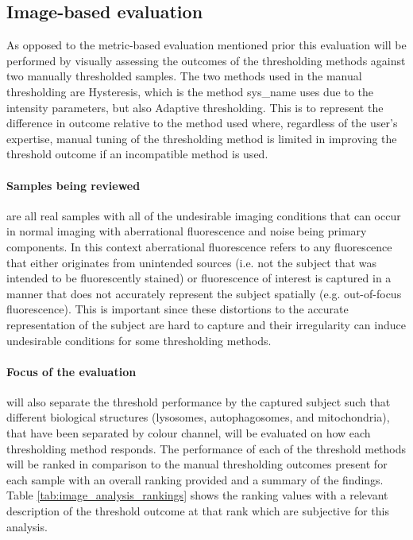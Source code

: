 \subsection{Image-based evaluation}\label{sec:image_compare}
As opposed to the metric-based evaluation mentioned prior this evaluation will be performed by visually assessing the outcomes of the thresholding methods against two manually thresholded samples. The two methods used in the manual thresholding are Hysteresis, which is the method \gls{sys_name} uses due to the intensity parameters, but also Adaptive thresholding. This is to represent the difference in outcome relative to the method used where, regardless of the user's expertise, manual tuning of the thresholding method is limited in improving the threshold outcome if an incompatible method is used.\paragraph{Samples being reviewed} are all real samples with all of the undesirable imaging conditions that can occur in normal imaging with aberrational fluorescence and noise being primary components. In this context aberrational fluorescence refers to any fluorescence that either originates from unintended sources (i.e. not the subject that was intended to be fluorescently stained) or fluorescence of interest is captured in a manner that does not accurately represent the subject spatially (e.g. out-of-focus fluorescence). This is important since these distortions to the accurate representation of the subject are hard to capture and their irregularity can induce undesirable conditions for some thresholding methods. \paragraph{Focus of the evaluation} will also separate the threshold performance by the captured subject such that different biological structures (lysosomes, autophagosomes, and mitochondria), that have been separated by colour channel, will be evaluated on how each thresholding method responds. The performance of each of the threshold methods will be ranked in comparison to the manual thresholding outcomes present for each sample with an overall ranking provided and a summary of the findings. Table \ref{tab:image_analysis_rankings} shows the ranking values with a relevant description of the threshold outcome at that rank which are subjective for this analysis. 

